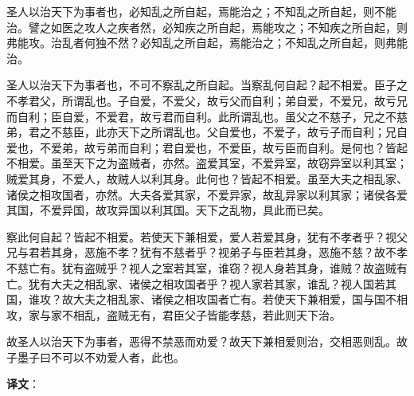 \documentclass[12pt,UTF-8,openany,a4]{ctexbook}
\begin{document}
\begin{large}
    
    圣人以治天下为事者也，必知乱之所自起，焉能治之；不知乱之所自起，则不能治。譬之如医之攻人之疾者然，必知疾之所自起，焉能攻之；不知疾之所自起，则弗能攻。治乱者何独不然？必知乱之所自起，焉能治之；不知乱之所自起，则弗能治。
    
    圣人以治天下为事者也，不可不察乱之所自起。当察乱何自起？起不相爱。臣子之不孝君父，所谓乱也。子自爱，不爱父，故亏父而自利；弟自爱，不爱兄，故亏兄而自利；臣自爱，不爱君，故亏君而自利。此所谓乱也。虽父之不慈子，兄之不慈弟，君之不慈臣，此亦天下之所谓乱也。父自爱也，不爱子，故亏子而自利；兄自爱也，不爱弟，故亏弟而自利；君自爱也，不爱臣，故亏臣而自利。是何也？皆起不相爱。虽至天下之为盗贼者，亦然。盗爱其室，不爱异室，故窃异室以利其室；贼爱其身，不爱人，故贼人以利其身。此何也？皆起不相爱。虽至大夫之相乱家、诸侯之相攻国者，亦然。大夫各爱其家，不爱异家，故乱异家以利其家；诸侯各爱其国，不爱异国，故攻异国以利其国。天下之乱物，具此而已矣。
    
    察此何自起？皆起不相爱。若使天下兼相爱，爱人若爱其身，犹有不孝者乎？视父兄与君若其身，恶施不孝？犹有不慈者乎？视弟子与臣若其身，恶施不慈？故不孝不慈亡有。犹有盗贼乎？视人之室若其室，谁窃？视人身若其身，谁贼？故盗贼有亡。犹有大夫之相乱家、诸侯之相攻国者乎？视人家若其家，谁乱？视人国若其国，谁攻？故大夫之相乱家、诸侯之相攻国者亡有。若使天下兼相爱，国与国不相攻，家与家不相乱，盗贼无有，君臣父子皆能孝慈，若此则天下治。
    
    故圣人以治天下为事者，恶得不禁恶而劝爱？故天下兼相爱则治，交相恶则乱。故子墨子曰不可以不劝爱人者，此也。

\end{large}


\newpage

\begin{Large}
   \noindent \textbf{译文}：
\end{Large}

\vspace{1em}
\end{document}
